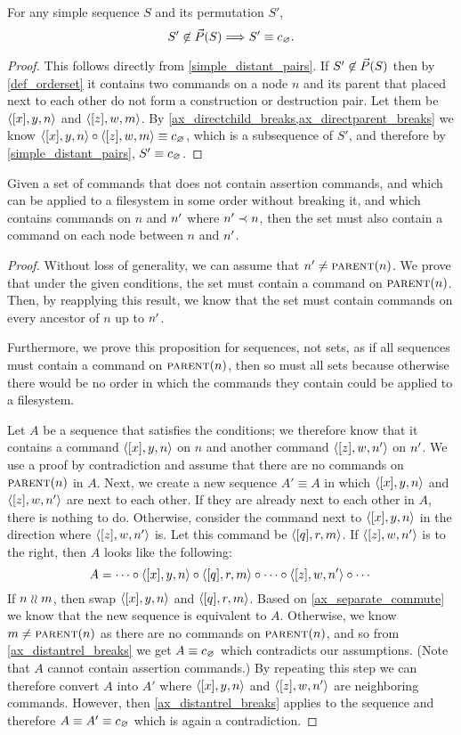 \begin{mycor}\label{order_is_only_possible}
For any simple sequence $S$ and its permutation $S'$, 
\[ S'\not\in\vec{P}({S}) \Longrightarrow S'\equiv c_\varnothing. \]
\end{mycor}
\begin{proof}
This follows directly from \cref{simple_distant_pairs}.
If $S'\not\in\vec{P}({S})$ then by \cref{def_orderset}
it contains two commands on a node $n$ and its parent
that placed next to each other do not form
a construction or destruction pair.
Let them be $\langle{[x],y,n}\rangle$ and $\langle{[z],w,m}\rangle$.
By \cref{ax_directchild_breaks,ax_directparent_breaks}
we know
$\langle{[x],y,n}\rangle\circ\langle{[z],w,m}\rangle\equiv c_\varnothing$, which is a subsequence of $S'$,
and therefore by \cref{simple_distant_pairs}, $S'\equiv c_\varnothing$.
\end{proof}



\begin{mylem}\label{connected_changes}
Given a set of commands that
does not contain assertion commands,
and which can be applied to a filesystem in some order without breaking it,
and which contains commands on $n$ and $n'$ where $n'\prec n$,
then the set must also contain a command
on each node between $n$ and $n'$.
\end{mylem}
\begin{proof}
Without loss of generality, we can assume that $n'\neq\text{\normalfont\scshape{parent}}(n)$.
We prove that under the given conditions, the set must contain a command on $\text{\normalfont\scshape{parent}}(n)$.
Then, by reapplying this result, we know that the set must contain commands on every
ancestor of $n$ up to $n'$.

Furthermore,
we prove this proposition for sequences, not sets, as if all sequences must contain a command on $\text{\normalfont\scshape{parent}}(n)$,
then so must all sets because otherwise there would be no order in which the commands they contain could be
applied to a filesystem.

Let $A$ be a sequence that satisfies the conditions;
we therefore know that it contains a command $\langle{[x],y,n}\rangle$ on $n$
and another command $\langle{[z],w,n'}\rangle$ on $n'$.
We use a proof by contradiction and assume that there are no commands on $\text{\normalfont\scshape{parent}}(n)$ in $A$.
Next, we create a new sequence $A'\equiv A$ in which $\langle{[x],y,n}\rangle$ and $\langle{[z],w,n'}\rangle$ are next to each other.
If they are already next to each other in $A$, there is nothing to do.
Otherwise, consider the command next to $\langle{[x],y,n}\rangle$ in the direction where $\langle{[z],w,n'}\rangle$ is.
Let this command be $\langle{[q],r,m}\rangle$.
If $\langle{[z],w,n'}\rangle$ is to the right, then $A$ looks like the following:
\[ A = \cdots\circ\langle{[x],y,n}\rangle\circ\langle{[q],r,m}\rangle\circ\cdots\circ\langle{[z],w,n'}\rangle\circ\cdots \]
If $n\mathrel{\wr\wr} m$, then swap $\langle{[x],y,n}\rangle$ and $\langle{[q],r,m}\rangle$. Based on \cref{ax_separate_commute} we know that the new
sequence is equivalent to $A$.
Otherwise, we know $m\neq\text{\normalfont\scshape{parent}}(n)$ as there are no commands on $\text{\normalfont\scshape{parent}}(n)$, and so
from \cref{ax_distantrel_breaks} we get $A\equiv c_\varnothing$ which contradicts our assumptions.
(Note that $A$ cannot contain assertion commands.)
By repeating this step we can therefore convert $A$ into $A'$ where $\langle{[x],y,n}\rangle$ and $\langle{[z],w,n'}\rangle$ are neighboring commands.
However, then \cref{ax_distantrel_breaks} applies to the sequence and therefore $A\equiv A'\equiv c_\varnothing$ which
is again a contradiction.
\end{proof}

